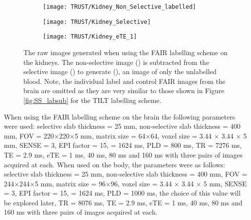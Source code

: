 \begin{figure}[H]
	\centering
	\begin{subfigure}[c]{0.30\textwidth}
		\centering
		\texttt{[image: TRUST/Kidney\_Non\_Selective\_labelled]}
		\caption{}
		\label{fig:RV_nonsel}
	\end{subfigure}
	\hfill
	\begin{subfigure}[c]{0.30\textwidth}
		\centering
		\texttt{[image: TRUST/Kidney\_Selective]}
		\caption{}
		\label{fig:RV_sel}
	\end{subfigure}
	\hfill
	\begin{subfigure}[c]{0.30\textwidth}
		\centering
		\texttt{[image: TRUST/Kidney\_eTE\_1]}
		\caption{}
		\label{fig:RV_diff}
	\end{subfigure}
	\caption{The raw images generated when using the \ac{FAIR} labelling scheme on the kidneys. The non-selective image () is subtracted from the selective image () to generate (), an image of only the unlabelled blood. Note, the individual label and control \ac{FAIR} images from the brain are omitted as they are very similar to those shown in Figure \ref{fig:SS_labsub} for the \ac{TILT} labelling scheme.}
	\label{fig:RV_labsub}
\end{figure}

When using the \ac{FAIR} labelling scheme on the brain the following parameters were used: selective slab thickness = 25 mm, non-selective slab thickness = 400 mm, \ac{FOV} = 220$\times$220$\times$5 mm, matrix size = 64$\times$64, voxel size = 3.44 $\times$ 3.44 $\times$ 5 mm, \ac{SENSE} = 3, \ac{EPI} factor = 15, \tone = 1624 ms, \ac{PLD} = 800 ms, \ac{TR} = 7276 ms, \ac{TE} = 2.9 ms, \ac{eTE} = 1 ms, 40 ms, 80 ms and 160 ms with three pairs of images acquired at each. When used on the body, the parameters were as follows: selective slab thickness = 25 mm, non-selective slab thickness = 400 mm, \ac{FOV} = 244$\times$244$\times$5 mm, matrix size = 96$\times$96, voxel size = 3.44 $\times$ 3.44 $\times$ 5 mm, \ac{SENSE} = 3, \ac{EPI} factor = 15, \tone = 1624 ms, \ac{PLD} = 1000 ms, the choice of this value will be explored later, \ac{TR} = 8076 ms, \ac{TE} = 2.9 ms, \ac{eTE} = 1 ms, 40 ms, 80 ms and 160 ms with three pairs of images acquired at each.

